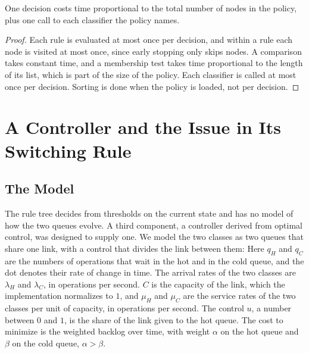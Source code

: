 \begin{proposition}
\label{prop:linear}%
One decision costs time proportional to the total number of nodes in the
policy, plus one call to each classifier the policy names.
\end{proposition}

\begin{proof}
Each rule is evaluated at most once per decision, and within a rule each
node is visited at most once, since early stopping only skips nodes. A
comparison takes constant time, and a membership test takes time
proportional to the length of its list, which is part of the size of the
policy. Each classifier is called at most once per decision. Sorting is done
when the policy is loaded, not per decision.
\end{proof}

\section{A Controller and the Issue in Its Switching Rule}
\label{sec:controller}

\subsection{The Model}

The rule tree decides from thresholds on the current state and has no model
of how the two queues evolve. A third component, a controller derived from
optimal control, was designed to supply one. We model the two classes as two
queues that share one link, with a control that divides the link between
them:
Here $q_H$ and $q_C$ are the numbers of operations that wait in the hot and
in the cold queue, and the dot denotes their rate of change in time. The
arrival rates of the two classes are $\lambda_H$ and $\lambda_C$, in
operations per second. $C$ is the capacity of the link, which the
implementation normalizes to $1$, and $\mu_H$ and $\mu_C$ are the service
rates of the two classes per unit of capacity, in operations per second. The
control $u$, a number between $0$ and $1$, is the share of the link given to
the hot queue. The cost to minimize is the weighted backlog over time, with
weight $\alpha$ on the hot queue and $\beta$ on the cold queue,
 $\alpha > \beta$.

